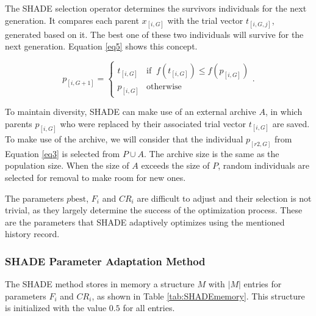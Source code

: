 The \acs{SHADE} selection operator determines the survivors individuals for the next generation. It compares each parent $x_{[i,G]}$ with the trial vector $t_{[i,G,j]}$, generated based on it. The best one of these two individuals will survive for the next generation. Equation \eqref{eq5} shows this concept.

\begin{equation}
p_{[i,G + 1]} = \left\{ \begin{array}{lc}
t_{[i,G]} &   \text{if} \;\; f(t_{[i,G]}) \le f(p_{[i,G]}) \\
p_{[i,G]} &  \text{otherwise}
\end{array}
\right..
\label{eq5}
\end{equation}

To maintain diversity, \acs{SHADE} can make use of an external archive $A$, in which parents $p_{[i,G]}$ who were replaced by their associated trial vector $t_{[i,G]}$ are saved. To make use of the archive, we will consider that the individual $p_{[r2,G]}$ from Equation \eqref{eq3} is selected from $P \cup A$. The archive size is the same as the population size. When the size of $A$ exceeds the size of $P$, random individuals are selected for removal to make room for new ones.

The parameters $p\text{best}$, $F_i$ and $CR_i$ are difficult to adjust and their selection is not trivial, as they largely determine the success of the optimization process. These are the parameters that \acs{SHADE} adaptively optimizes using the mentioned history record.

\subsubsection[\acsfont{SHADE} Parameter Adaptation Method]{SHADE Parameter Adaptation Method}

The \acs{SHADE} method stores in memory a structure $M$ with $|M|$ entries for parameters $F_i$ and $CR_i$, as shown in Table \ref{tab:SHADEmemory}. This structure is initialized with the value $0.5$ for all entries.

\begin{table}[!h]
	\centering
	\setlength{\tabcolsep}{13pt}
	\caption[Historical memory $M_{CR}$, $M_{F}$ used by \acs{SHADE}.]{Historical memory $M_{CR}$, $M_{F}$ used by \acs{SHADE} \cite{tanabe2013success}.}
	\label{tab:SHADEmemory}
\end{table}

